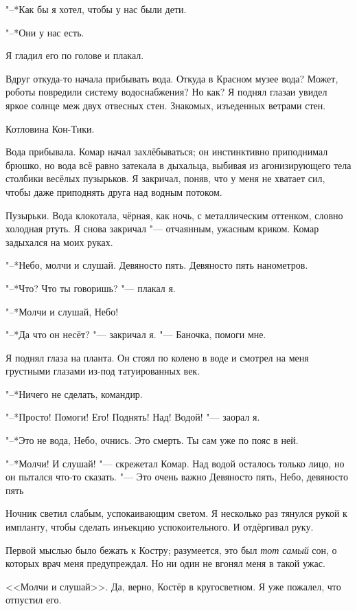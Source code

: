 "--*Как бы я хотел, чтобы у нас были дети.

"--*Они у нас есть.

Я гладил его по голове и плакал.

Вдруг откуда-то начала прибывать вода.
Откуда в Красном музее вода?
Может, роботы повредили систему водоснабжения?
Но как?
Я поднял глаза\ldotst и увидел яркое солнце меж двух отвесных стен.
Знакомых, изъеденных ветрами стен.

Котловина Кон-Тики.

Вода прибывала.
Комар начал захлёбываться;
он инстинктивно приподнимал брюшко, но вода всё равно затекала в дыхальца, выбивая из агонизирующего тела столбики весёлых пузырьков.
Я закричал, поняв, что у меня не хватает сил, чтобы даже приподнять друга над водным потоком.

Пузырьки.
Вода клокотала, чёрная, как ночь, с металлическим оттенком, словно холодная ртуть.
Я снова закричал "--- отчаянным, ужасным криком.
Комар задыхался на моих руках.

"--*Небо, молчи и слушай.
Девяносто пять.
Девяносто пять нанометров.

"--*Что?
Что ты говоришь? "--- плакал я.

"--*Молчи и слушай, Небо!

"--*Да что он несёт? "--- закричал я.
"--- Баночка, помоги мне.

Я поднял глаза на планта.
Он стоял по колено в воде и смотрел на меня грустными глазами из-под татуированных век.

"--*Ничего не сделать, командир.

"--*Просто! Помоги! Его! Поднять! Над! Водой! "--- заорал я.

"--*Это не вода, Небо, очнись.
Это смерть.
Ты сам уже по пояс в ней.

"--*Молчи! И слушай! "--- скрежетал Комар.
Над водой осталось только лицо, но он пытался что-то сказать.
"--- Это очень важно\ldotst
Девяносто пять, Небо, девяносто пять\ldotst

\razd

Ночник светил слабым, успокаивающим светом.
Я несколько раз тянулся рукой к импланту, чтобы сделать инъекцию успокоительного.
И отдёргивал руку.

Первой мыслью было бежать к Костру;
разумеется, это был \emph{тот самый} сон, о которых врач меня предупреждал.
Но ни один не вгонял меня в такой ужас.

<<Молчи и слушай>>.
Да, верно, Костёр в кругосветном.
Я уже пожалел, что отпустил его.

